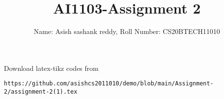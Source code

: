 \documentclass[journal,12pt,twocolumn]{IEEEtran}
\DeclareMathOperator*{\Res}{Res}
\begin{document}
\newcommand{\BEQA}{\begin{eqnarray}}
\newcommand{\EEQA}{\end{eqnarray}}
\newcommand{\define}{\stackrel{\triangle}{=}}

\raggedbottom
\setlength{\parindent}{0pt}
\providecommand{\mbf}{\mathbf}
\providecommand{\pr}[1]{\ensuremath{\Pr\left(#1\right)}}
\providecommand{\qfunc}[1]{\ensuremath{Q\left(#1\right)}}
\providecommand{\sbrak}[1]{\ensuremath{{}\left[#1\right]}}
\providecommand{\lsbrak}[1]{\ensuremath{{}\left[#1\right.}}
\providecommand{\rsbrak}[1]{\ensuremath{{}\left.#1\right]}}
\providecommand{\brak}[1]{\ensuremath{\left(#1\right)}}
\providecommand{\lbrak}[1]{\ensuremath{\left(#1\right.}}
\providecommand{\rbrak}[1]{\ensuremath{\left.#1\right)}}
\providecommand{\cbrak}[1]{\ensuremath{\left\{#1\right\}}}
\providecommand{\lcbrak}[1]{\ensuremath{\left\{#1\right.}}
\providecommand{\rcbrak}[1]{\ensuremath{\left.#1\right\}}}
\theoremstyle{remark}
\newtheorem{rem}{Remark}
\newcommand{\sgn}{\mathop{\mathrm{sgn}}}
\providecommand{\abs}[1]{\vert#1\vert}
\providecommand{\res}[1]{\Res\displaylimits_{#1}} 
\providecommand{\norm}[1]{\lVert#1\rVert}
\providecommand{\mtx}[1]{\mathbf{#1}}
\providecommand{\mean}[1]{E[ #1 ]}
\providecommand{\fourier}{\overset{\mathcal{F}}{ \rightleftharpoons}}
\providecommand{\system}{\overset{\mathcal{H}}{ \longleftrightarrow}}
\newcommand{\solution}{\noindent \textbf{Solution: }}
\newcommand{\cosec}{\,\text{cosec}\,}
\providecommand{\dec}[2]{\ensuremath{\overset{#1}{\underset{#2}{\gtrless}}}}
\newcommand{\myvec}[1]{\ensuremath{\begin{pmatrix}#1\end{pmatrix}}}
\newcommand{\mydet}[1]{\ensuremath{\begin{vmatrix}#1\end{vmatrix}}}
\makeatletter
{}
\makeatother
\let\StandardTheFigure\thefigure
\let\vec\mathbf
\renewcommand{\thefigure}{\theproblem}
\def\putbox#1#2#3{\makebox[0in][l]{\makebox[#1][l]{}\raisebox{\baselineskip}[0in][0in]{\raisebox{#2}[0in][0in]{#3}}}}
     \def\rightbox#1{\makebox[0in][r]{#1}}
     \def\centbox#1{\makebox[0in]{#1}}
     \def\topbox#1{\raisebox{-\baselineskip}[0in][0in]{#1}}
     \def\midbox#1{\raisebox{-0.5\baselineskip}[0in][0in]{#1}}
\vspace{3cm}
\title{AI1103-Assignment 2}
\author{Name: Asish sashank reddy, Roll Number: CS20BTECH11010}
\maketitle
\newpage
\bigskip
\renewcommand{\thefigure}{\theenumi}
\renewcommand{\thetable}{\theenumi}
Download latex-tikz codes from 
%
\begin{lstlisting}
https://github.com/asishcs2011010/demo/blob/main/Assignment-2/assignment-2(1).tex
\end{lstlisting}
\end{document}
